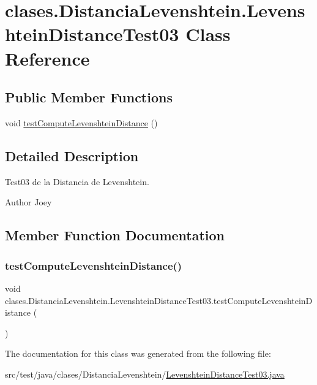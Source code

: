 \hypertarget{classclases_1_1_distancia_levenshtein_1_1_levenshtein_distance_test03}{}\section{clases.\+Distancia\+Levenshtein.\+Levenshtein\+Distance\+Test03 Class Reference}
\label{classclases_1_1_distancia_levenshtein_1_1_levenshtein_distance_test03}
\subsection*{Public Member Functions}
\begin{DoxyCompactItemize}
\item 
void \hyperlink{classclases_1_1_distancia_levenshtein_1_1_levenshtein_distance_test03_afa83a142e84686e31e74757c35a8db60}{test\+Compute\+Levenshtein\+Distance} ()
\end{DoxyCompactItemize}


\subsection{Detailed Description}
Test03 de la Distancia de Levenshtein. \begin{DoxyAuthor}{Author}
Joey 
\end{DoxyAuthor}


\subsection{Member Function Documentation}
\hypertarget{classclases_1_1_distancia_levenshtein_1_1_levenshtein_distance_test03_afa83a142e84686e31e74757c35a8db60}{}\label{classclases_1_1_distancia_levenshtein_1_1_levenshtein_distance_test03_afa83a142e84686e31e74757c35a8db60} 
\subsubsection{\texorpdfstring{test\+Compute\+Levenshtein\+Distance()}{testComputeLevenshteinDistance()}}
{\footnotesize\ttfamily void clases.\+Distancia\+Levenshtein.\+Levenshtein\+Distance\+Test03.\+test\+Compute\+Levenshtein\+Distance (\begin{DoxyParamCaption}{ }\end{DoxyParamCaption})}



The documentation for this class was generated from the following file\+:\begin{DoxyCompactItemize}
\item 
src/test/java/clases/\+Distancia\+Levenshtein/\hyperlink{_levenshtein_distance_test03_8java}{Levenshtein\+Distance\+Test03.\+java}\end{DoxyCompactItemize}
